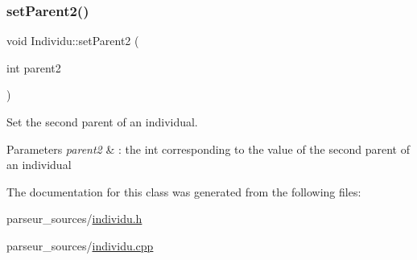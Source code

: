 \subsubsection{\texorpdfstring{set\+Parent2()}{setParent2()}}
{\footnotesize\ttfamily void Individu\+::set\+Parent2 (\begin{DoxyParamCaption}\item[{int}]{parent2 }\end{DoxyParamCaption})}



Set the second parent of an individual. 


\begin{DoxyParams}{Parameters}
{\em parent2} & \+: the int corresponding to the value of the second parent of an individual \\
\hline
\end{DoxyParams}


The documentation for this class was generated from the following files\+:\begin{DoxyCompactItemize}
\item 
parseur\+\_\+sources/\hyperlink{individu_8h}{individu.\+h}\item 
parseur\+\_\+sources/\hyperlink{individu_8cpp}{individu.\+cpp}\end{DoxyCompactItemize}
